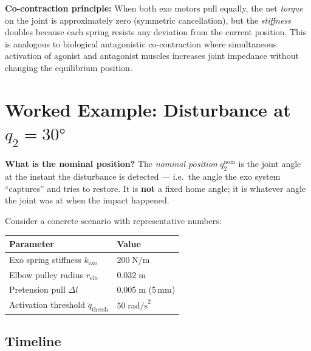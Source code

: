 \documentclass[11pt, a4paper]{article}
\begin{document}
\begin{mdframed}
\textbf{Co-contraction principle:}
When both exo motors pull equally, the net \emph{torque} on the joint is
approximately zero (symmetric cancellation), but the \emph{stiffness} doubles
because each spring resists any deviation from the current position.  This is
analogous to biological antagonistic co-contraction where simultaneous
activation of agonist and antagonist muscles increases joint impedance without
changing the equilibrium position.
\end{mdframed}

\section{Worked Example: Disturbance at $q_2 = 30°$}
\label{sec:example}

\begin{mdframed}
\textbf{What is the nominal position?}
The \emph{nominal position} $q_2^{\text{nom}}$ is the joint angle at the
instant the disturbance is detected --- i.e.\ the angle the exo system
``captures'' and tries to restore.  It is \textbf{not} a fixed home angle;
it is whatever angle the joint was at when the impact happened.
\end{mdframed}

\noindent
Consider a concrete scenario with representative numbers:

\begin{table}[h]
\centering
\begin{tabular}{@{}ll@{}}
\toprule
\textbf{Parameter} & \textbf{Value} \\
\midrule
Exo spring stiffness $k_{\text{exo}}$      & $200\;\text{N/m}$ \\
Elbow pulley radius  $r_{\text{elb}}$      & $0.032\;\text{m}$ \\
Pretension pull      $\Delta l$            & $0.005\;\text{m}$ (5\,mm) \\
Activation threshold $\ddot{q}_{\text{thresh}}$ & $50\;\text{rad/s}^2$ \\
\bottomrule
\end{tabular}
\end{table}

\subsection*{Timeline}
\end{document}
